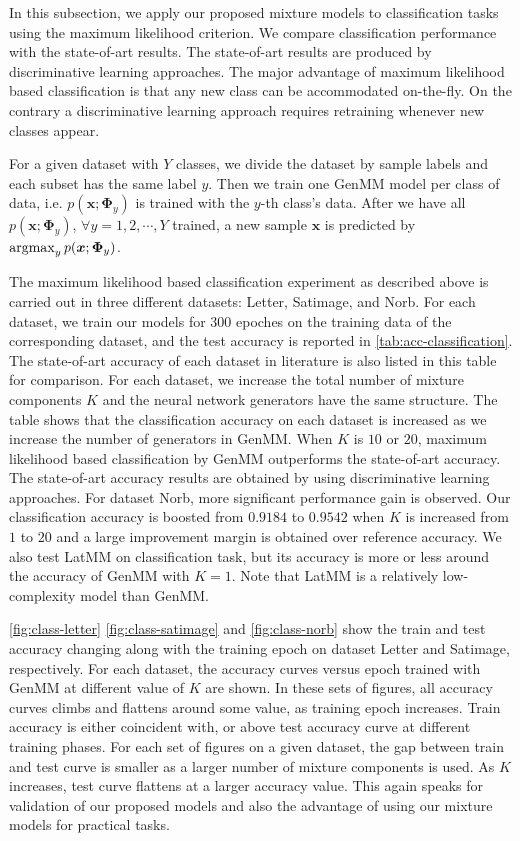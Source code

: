 In this subsection, we apply our proposed mixture models to classification tasks using the maximum likelihood criterion. We compare classification performance with the state-of-art results. The state-of-art results are produced by discriminative learning approaches. The major advantage of maximum likelihood based classification is that any new class can be accommodated on-the-fly. On the contrary a discriminative learning approach requires retraining whenever new classes appear. 

For a given dataset with $Y$ classes, we divide the dataset by sample labels and each subset has the same label $y$. Then we train one GenMM model per class of data, i.e. $p(\bm{x};\bm{\Phi}_{y})$ is trained with the $y$-th class's data. After we have all $p(\bm{x};\bm{\Phi}_y)$, $\forall y = 1, 2, \cdots, Y$ trained, a new sample $\bm{x}$ is predicted by $\operatorname{argmax}_{y} p(\bm{x};\bm{\Phi}_y)$.

The maximum likelihood based classification experiment as described above is carried out in three different datasets: Letter, Satimage, and Norb. For each dataset, we train our models for $300$ epoches on the training data of the corresponding dataset, and the test accuracy is reported in \autoref{tab:acc-classification}. The state-of-art accuracy of each dataset in literature is also listed in this table for comparison. For each dataset, we increase the total number of mixture components $K$ and the neural network generators have the same structure. The table shows that the classification accuracy on each dataset is increased as we increase the number of generators in GenMM. When $K$ is $10$ or $20$, maximum likelihood based classification by GenMM outperforms the state-of-art accuracy. The state-of-art accuracy results are obtained by using discriminative learning approaches. For dataset Norb, more significant performance gain is observed. Our classification accuracy is boosted from $0.9184$ to $0.9542$ when $K$ is increased from $1$ to $20$ and a large improvement margin is obtained over reference accuracy. We also test LatMM on classification task, but its accuracy is more or less around the accuracy of GenMM with $K=1$. Note that LatMM is a relatively low-complexity model than GenMM. 

\autoref{fig:class-letter} \autoref{fig:class-satimage} and \autoref{fig:class-norb} show the train and test accuracy changing along with the training epoch on dataset Letter and Satimage, respectively. For each dataset, the accuracy curves versus epoch trained with GenMM at different value of $K$ are shown. In these sets of figures, all accuracy curves climbs and flattens around some value, as training epoch increases. Train accuracy is either coincident with, or above test accuracy curve at different training phases. For each set of figures on a given dataset, the gap between train and test curve is smaller as a larger number of mixture components is used. As $K$ increases, test curve flattens at a larger accuracy value. This again speaks for validation of our proposed models and also the advantage of using our mixture models for practical tasks.

